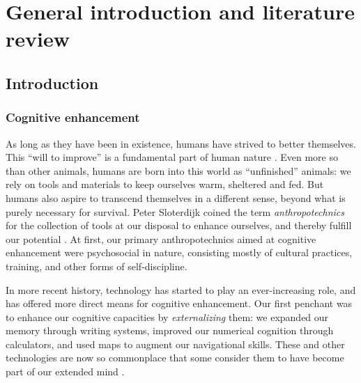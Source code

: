 \documentclass[11pt,english,]{memoir}
\def\defstyle{Ruled} %
\begin{document}
\clearpage
\pagestyle{\defstyle}
\mainmatter


\hypertarget{part-intro}{%
\part{General introduction and literature review}\label{part-intro}}

\hypertarget{intro-general}{%
\chapter{Introduction}\label{intro-general}}

\hypertarget{cognitive-enhancement}{%
\section{Cognitive enhancement}\label{cognitive-enhancement}}

As long as they have been in existence, humans have strived to better themselves. This ``will to improve'' is a fundamental part of human nature \autocite{Sloterdijk2009}. Even more so than other animals, humans are born into this world as ``unfinished'' animals: we rely on tools and materials to keep ourselves warm, sheltered and fed. But humans also aspire to transcend themselves in a different sense, beyond what is purely necessary for survival. Peter Sloterdijk coined the term \emph{anthropotechnics} for the collection of tools at our disposal to enhance ourselves, and thereby fulfill our potential \autocite*{Sloterdijk2001}. At first, our primary anthropotechnics aimed at cognitive enhancement were psychosocial in nature, consisting mostly of cultural practices, training, and other forms of self-discipline.

In more recent history, technology has started to play an ever-increasing role, and has offered more direct means for cognitive enhancement. Our first penchant was to enhance our cognitive capacities by \emph{externalizing} them: we expanded our memory through writing systems, improved our numerical cognition through calculators, and used maps to augment our navigational skills. These and other technologies are now so commonplace that some consider them to have become part of our extended mind \autocite{Clark1998}.
\end{document}
